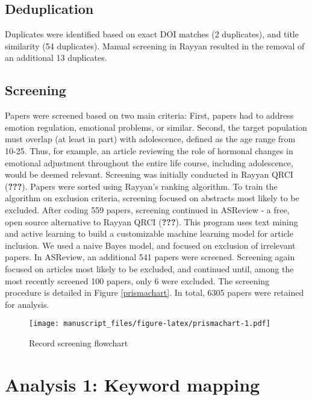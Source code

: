 \documentclass[
  english,
  man]{apa6}
\begin{document}
\hypertarget{deduplication}{%
\subsection{Deduplication}\label{deduplication}}

Duplicates were identified based on exact DOI matches (2
duplicates), and title similarity (54 duplicates).
Manual screening in Rayyan resulted in the removal of an additional 13 duplicates.

\hypertarget{screening}{%
\subsection{Screening}\label{screening}}

Papers were screened based on two main criteria: First, papers had to address emotion regulation, emotional problems, or similar. Second, the target population must overlap (at least in part) with adolescence, defined as the age range from 10-25. Thus, for example, an article reviewing the role of hormonal changes in emotional adjustment throughout the entire life course, including adolescence, would be deemed relevant. Screening was initially conducted in Rayyan QRCI ({\textbf{???}}). Papers were sorted using Rayyan's ranking algorithm. To train the algorithm on exclusion criteria, screening focused on abstracts most likely to be excluded. After coding 559 papers, screening continued in ASReview - a free, open source alternative to Rayyan QRCI ({\textbf{???}}). This program uses text mining and active learning to build a customizable machine learning model for article inclusion. We used a naive Bayes model, and focused on exclusion of irrelevant papers. In ASReview, an additional 541 papers were screened. Screening again focused on articles most likely to be excluded, and continued until, among the most recently screened 100 papers, only 6 were excluded. The screening procedure is detailed in Figure \ref{prismachart}. In total, 6305 papers were retained for analysis.

\begin{figure}
\centering
\texttt{[image: manuscript\_files/figure-latex/prismachart-1.pdf]}
\caption{\label{fig:prismachart}Record screening flowchart}
\end{figure}

\hypertarget{analysis-1-keyword-mapping}{%
\section{Analysis 1: Keyword mapping}\label{analysis-1-keyword-mapping}}
\end{document}
